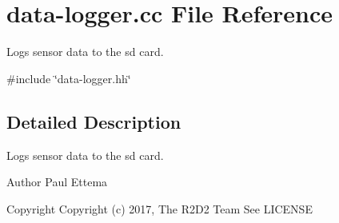 \hypertarget{data-logger_8cc}{}\section{data-\/logger.cc File Reference}
\label{data-logger_8cc}


Logs sensor data to the sd card.  


{\ttfamily \#include \char`\"{}data-\/logger.\+hh\char`\"{}}\newline


\subsection{Detailed Description}
Logs sensor data to the sd card. 

\begin{DoxyAuthor}{Author}
Paul Ettema 
\end{DoxyAuthor}
\begin{DoxyCopyright}{Copyright}
Copyright (c) 2017, The R2\+D2 Team  See L\+I\+C\+E\+N\+SE 
\end{DoxyCopyright}
